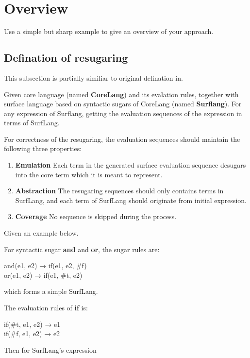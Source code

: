 \section{Overview}
\label{sec2}

Use a simple but sharp example to give an overview of your approach.

\subsection{Defination of resugaring}
This subsection is partially similiar to original defination in\cite{resugaring}.
\begin{Def}[Resugaring]
Given core language (named {\bfseries CoreLang}) and its evalation rules, together with surface language based on syntactic sugars of CoreLang (named {\bfseries Surflang}). For any expression of Surflang, getting the evaluation sequences of the expression in terms of SurfLang. 
\end{Def}
For correctness of the resugaring, the evaluation sequences should maintain the following three properties:
\begin{enumerate}
\item {\bfseries Emulation} Each term in the generated surface evaluation sequence desugars into the core term which it is meant to represent.
\item {\bfseries Abstraction} The resugaring sequences should only contains terms in SurfLang, and each term of SurfLang should originate from initial expression.
\item {\bfseries Coverage} No sequence is skipped during the process.
\end{enumerate}

Given an example below.

For syntactic sugar {\bfseries and} and {\bfseries or}, the sugar rules are:
\begin{center}
	\parbox[t]{\textwidth}{%
		\begin{center}  
			and(e1, e2) → if(e1, e2, \#f)\\
			or(e1, e2) → if(e1, \#t, e2)
		\end{center}  
	}%
\end{center}
which forms a simple SurfLang.

The evaluation rules of {\bfseries if} is:
\begin{center}
	\parbox[t]{\textwidth}{%
		\begin{center}  
			if(\#t, e1, e2) → e1\\
			if(\#f, e1, e2) → e2
		\end{center}  
	}%
\end{center}

Then for SurfLang's expression